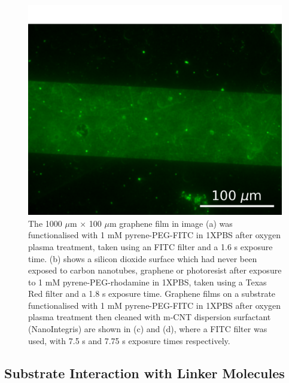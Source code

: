 \documentclass[
  a4paper,
]{scrbook}
\begin{document}
\begin{figure}
\begin{minipage}[t]{0.47\linewidth}
{{\includegraphics{figures/ch6/modified_NGW6D7_PyPEGFITC_channel1_postmsurfclean_7.75sexposure_40X_221123.png}

}

}

\subcaption{\label{fig-PPF-PBS-40X}}
\end{minipage}%

\caption{\label{fig-silicon-dioxide-interaction}The 1000 \(\mu\)m
\(\times\) 100 \(\mu\)m graphene film in image (a) was functionalised
with 1 mM pyrene-PEG-FITC in 1XPBS after oxygen plasma treatment, taken
using an FITC filter and a 1.6 s exposure time. (b) shows a silicon
dioxide surface which had never been exposed to carbon nanotubes,
graphene or photoresist after exposure to 1 mM pyrene-PEG-rhodamine in
1XPBS, taken using a Texas Red filter and a 1.8 s exposure time.
Graphene films on a substrate functionalised with 1 mM pyrene-PEG-FITC
in 1XPBS after oxygen plasma treatment then cleaned with m-CNT
dispersion surfactant (NanoIntegris) are shown in (c) and (d), where a
FITC filter was used, with 7.5 s and 7.75 s exposure times
respectively.}

\end{figure}

\hypertarget{sec-pyrene-interactions}{%
\subsection{Substrate Interaction with Linker
Molecules}\label{sec-pyrene-interactions}}
\end{document}
